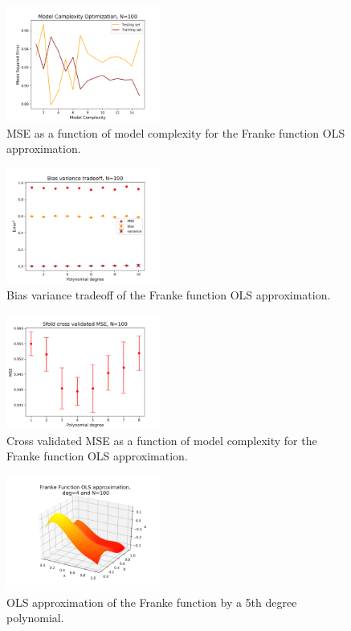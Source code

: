 \documentclass[notitlepage, reprint, nofootinbib]{revtex4-1}
\begin{document}
\begin{figure}
	\centering
	\includegraphics[width=0.45\textwidth]{../Figures/model_complexity_mse_franke_N100.png}
	\caption{MSE as a function of model complexity for the Franke function OLS approximation.}
	\label{fig3}
\end{figure}
\begin{figure}
	\centering
	\includegraphics[width=0.45\textwidth]{../Figures/b-v_tradeoff_franke_N100.png}
	\caption{Bias variance tradeoff of the Franke function OLS approximation.}
	\label{fig4}
\end{figure}
\begin{figure}
	\centering
	\includegraphics[width=0.45\textwidth]{../Figures/kfold_mse_N100.png}
	\caption{Cross validated MSE as a function of model complexity for the Franke function OLS approximation.}
	\label{fig5}
\end{figure}
\begin{figure}
 	\centering
	\includegraphics[width=0.45\textwidth]{../Figures/franke_OLS_deg4_N100.png}
  	\caption{OLS approximation of the Franke function by a 5th degree polynomial.}
	\label{fig1}
\end{figure}
\end{document}

